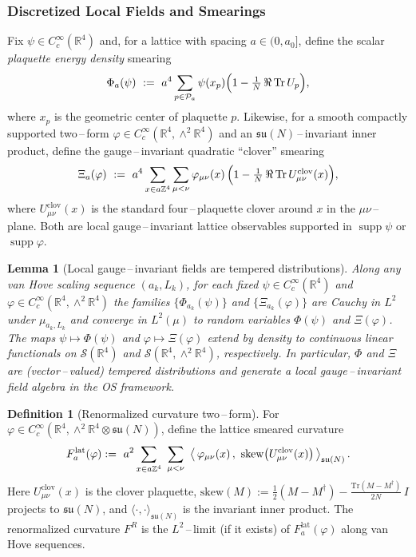 \documentclass[11pt]{amsart}
\theoremstyle{plain}
\newtheorem{lemma}[theorem]{Lemma}
\theoremstyle{definition}
\newtheorem{definition}[theorem]{Definition}
\theoremstyle{remark}
\renewcommand{\tfrac}[2]{\textstyle\frac{#1}{#2}}
\begin{document}
\subsubsection*{Discretized Local Fields and Smearings}
Fix $\psi\in C_c^\infty(\mathbb R^4)$ and, for a lattice with spacing $a\in(0,a_0]$, define the scalar \emph{plaquette energy density} smearing
\[
  \Phi_a(\psi)\ :=\ a^4\sum_{p\in\mathcal P_a} \psi(x_p)\Bigl(1-\tfrac1N\,\Re\,\mathrm{Tr}\,U_p\Bigr),
\]
where $x_p$ is the geometric center of plaquette $p$. Likewise, for a smooth compactly supported two\,--\,form $\varphi\in C_c^\infty(\mathbb R^4,\wedge^2\mathbb R^4)$ and an $\mathfrak{su}(N)$\,--\,invariant inner product, define the gauge\,--\,invariant quadratic ``clover'' smearing
\[
  \Xi_a(\varphi)\ :=\ a^4\sum_{x\in a\mathbb Z^4} \sum_{\mu<\nu} \varphi_{\mu\nu}(x)\,\Bigl(1-\tfrac1N\,\Re\,\mathrm{Tr}\,U^{\text{clov}}_{\mu\nu}(x)\Bigr),
\]
where $U^{\text{clov}}_{\mu\nu}(x)$ is the standard four\,--\,plaquette clover around $x$ in the $\mu\nu$\,--\,plane. Both are local gauge\,--\,invariant lattice observables supported in $\operatorname{supp}\psi$ or $\operatorname{supp}\varphi$.
\begin{lemma}[Local gauge\,--\,invariant fields are tempered distributions]
\label{lem:local-fields-tempered}
Along any van Hove scaling sequence $(a_k,L_k)$, for each fixed $\psi\in C_c^\infty(\mathbb R^4)$ and $\varphi\in C_c^\infty(\mathbb R^4,\wedge^2\mathbb R^4)$ the families $\{\Phi_{a_k}(\psi)\}$ and $\{\Xi_{a_k}(\varphi)\}$ are Cauchy in $L^2$ under $\mu_{a_k,L_k}$ and converge in $L^2(\mu)$ to random variables $\Phi(\psi)$ and $\Xi(\varphi)$. The maps $\psi\mapsto\Phi(\psi)$ and $\varphi\mapsto\Xi(\varphi)$ extend by density to continuous linear functionals on $\mathcal S(\mathbb R^4)$ and $\mathcal S(\mathbb R^4,\wedge^2\mathbb R^4)$, respectively. In particular, $\Phi$ and $\Xi$ are (vector\,--\,valued) tempered distributions and generate a local gauge\,--\,invariant field algebra in the OS framework.
\end{lemma}

\begin{definition}[Renormalized curvature two\,--\,form]\label{def:FR}
For $\varphi\in C_c^\infty(\mathbb R^4,\wedge^2\mathbb R^4\otimes\mathfrak{su}(N))$, define the lattice smeared curvature
\[
  F^{\mathrm{lat}}_{a}(\varphi)
   \\ :=\ a^2 \sum_{x\in a\mathbb Z^4}\ \sum_{\mu<\nu}\ \big\langle\, \varphi_{\mu\nu}(x)\,,\ \mathrm{skew}\big(U^{\mathrm{clov}}_{\mu\nu}(x)\big)\,\big\rangle_{\mathfrak{su}(N)}\,.
\]
Here $U^{\mathrm{clov}}_{\mu\nu}(x)$ is the clover plaquette, $\mathrm{skew}(M):=\tfrac{1}{2}(M-M^\dagger)-\tfrac{\mathrm{Tr}(M-M^\dagger)}{2N}\,I$ projects to $\mathfrak{su}(N)$, and $\langle\cdot,\cdot\rangle_{\mathfrak{su}(N)}$ is the invariant inner product. The renormalized curvature $F^R$ is the $L^2$\,–\,limit (if it exists) of $F^{\mathrm{lat}}_{a}(\varphi)$ along van Hove sequences.
\end{definition}
\end{document}
